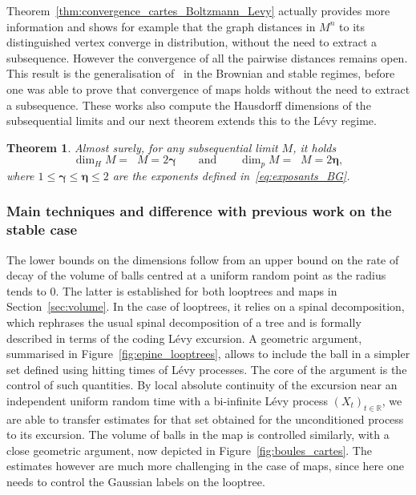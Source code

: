 \documentclass[british, a4paper,11pt]{article}
\numberwithin{equation}{section}
\newtheorem{thm}{\bfseries \upshape Theorem}[section]
\theoremstyle{definition}
\newcommand{\R}{\mathbb{R}}
\newcommand{\Map}{M}
\DeclareMathOperator{\diminf}{\underline{\dim}}%
\DeclareMathOperator{\dimsup}{\overline{\dim}}%
\newcommand{\bdgamma}{\boldsymbol{\gamma}}
\newcommand{\bdeta}{\boldsymbol{\eta}}
\begin{document}
Theorem~\ref{thm:convergence_cartes_Boltzmann_Levy} actually provides more information and shows for example that the graph distances in $M^n$ to its distinguished vertex converge in distribution, without the need to extract a subsequence. However the convergence of all the pairwise distances remains open.
This result is the generalisation of~\cite{LG07, LGM11} in the Brownian and stable regimes, before one was able to prove that convergence of maps holds without the need to extract a subsequence.
These works also compute the Hausdorff dimensions of the subsequential limits and our next theorem extends this to the L\'evy regime.


\begin{thm}\label{thm:dimensions_cartes_Levy}
Almost surely, 
for any subsequential limit $M$,
it holds
\[\dim_{H} \Map = \diminf \Map = 2\bdgamma
\qquad\text{and}\qquad
\dim_{p} \Map = \dimsup \Map = 2\bdeta,\]
where $1 \leq \bdgamma \leq \bdeta \leq 2$ are the exponents defined in~\eqref{eq:exposants_BG}.
\end{thm}



\subsubsection*{Main techniques and difference with previous work on the stable case} The lower bounds on the dimensions follow from an upper bound on the rate of decay of the volume of balls centred at a uniform random point as the radius tends to $0$. The latter is established for both looptrees and maps in Section~\ref{sec:volume}. In the case of looptrees, it relies on a spinal decomposition, which rephrases the usual spinal decomposition of a tree and is formally described in terms of the coding L\'evy excursion. 
A geometric argument, summarised in Figure~\ref{fig:epine_looptrees}, allows to include the ball in a simpler set defined using hitting times of L\'evy processes. The core of the argument is the control of such quantities.
By local absolute continuity of the excursion near an independent uniform random time with a bi-infinite L\'evy process $(X_t)_{t \in \R}$, we are able to transfer estimates for that set obtained for the unconditioned process to its excursion.
The volume of balls in the map is controlled similarly, with a close geometric argument, now depicted in Figure~\ref{fig:boules_cartes}. The estimates however are much more challenging in the case of maps, since here one needs to control the Gaussian labels on the looptree.
\end{document}

